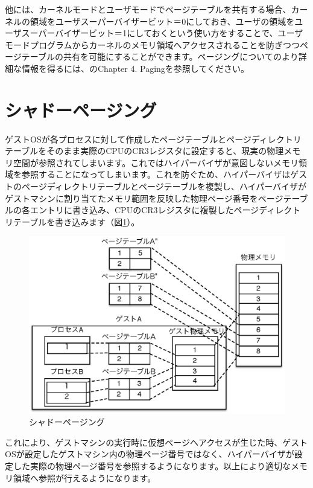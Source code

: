 \documentclass[a4j,12pt]{jarticle}
\begin{document}
他には、カーネルモードとユーザモードでページテーブルを共有する場合、カーネルの領域をユーザスーパーバイザービット＝0にしておき、ユーザの領域をユーザスーパーバイザービット＝1にしておくという使い方をすることで、ユーザモードプログラムからカーネルのメモリ領域へアクセスされることを防ぎつつページテーブルの共有を可能にすることができます。ページングについてのより詳細な情報を得るには、\cite{SDM}のChapter 4. Pagingを参照してください。

\section{シャドーページング}
ゲストOSが各プロセスに対して作成したページテーブルとページディレクトリテーブルをそのまま実際のCPUのCR3レジスタに設定すると、現実の物理メモリ空間が参照されてしまいます。これではハイパーバイザが意図しないメモリ領域を参照することになってしまいます。これを防ぐため、ハイパーバイザはゲストのページディレクトリテーブルとページテーブルを複製し、ハイパーバイザがゲストマシンに割り当てたメモリ範囲を反映した物理ページ番号をページテーブルの各エントリに書き込み、CPUのCR3レジスタに複製したページディレクトリテーブルを書き込みます（図\ref{fig6}）。

\begin{figure}
\includegraphics{figures/part2_fig6.eps}
\caption{シャドーページング}
\label{fig6}
\end{figure}

これにより、ゲストマシンの実行時に仮想ページへアクセスが生じた時、ゲストOSが設定したゲストマシン内の物理ページ番号ではなく、ハイパーバイザが設定した実際の物理ページ番号を参照するようになります。以上により適切なメモリ領域へ参照が行えるようになります。
\end{document}
